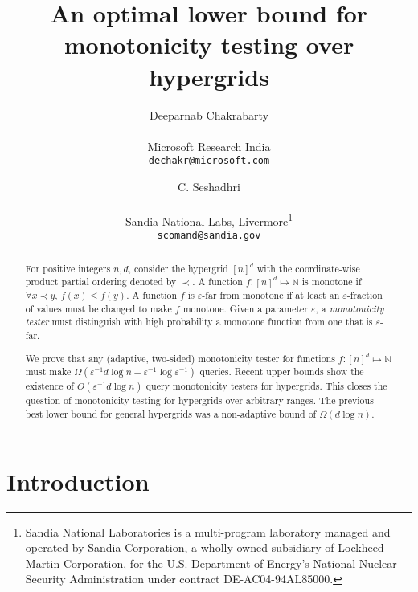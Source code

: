 \documentclass[11pt]{article}
\def\eps{\varepsilon}
\def\R{{\mathbb R}}
\newcommand{\NN}{\mathbb{N}}
\begin{document}
\author{Deeparnab Chakrabarty
  \\\\ 
  Microsoft Research India\\
  {\tt dechakr@microsoft.com} \\
\and C. Seshadhri \\\\ 
Sandia National Labs, Livermore\thanks{Sandia National Laboratories is a multi-program laboratory managed and operated by Sandia Corporation, a wholly owned subsidiary of Lockheed Martin Corporation, for the U.S. Department of Energy's National Nuclear Security Administration under contract DE-AC04-94AL85000.} \\
{\tt scomand@sandia.gov}}


\title{An optimal lower bound for monotonicity testing over hypergrids}



\date{}
\maketitle
\def\D{{\mathbf D}}
\def\R{{\mathbf R}}

\begin{abstract} For positive integers $n, d$, consider the hypergrid $[n]^d$ with the coordinate-wise product partial ordering denoted by $\prec$. 
A function $f: [n]^d \mapsto \NN$ is monotone if $\forall x \prec y$, $f(x) \leq f(y)$.
A function $f$ is $\eps$-far from monotone if at least an $\eps$-fraction of values must be changed to make
$f$ monotone. Given a parameter $\eps$, a \emph{monotonicity tester} must distinguish with high probability a monotone function from one that is $\eps$-far.

We prove that any (adaptive, two-sided) monotonicity tester for functions $f:[n]^d \mapsto \NN$ must make
$\Omega(\eps^{-1}d\log n - \eps^{-1}\log \eps^{-1})$ queries. Recent upper bounds show the existence of $O(\eps^{-1}d \log n)$
query monotonicity testers for hypergrids. This closes the question of monotonicity testing for hypergrids
over arbitrary ranges. The previous best lower bound for general hypergrids was a non-adaptive bound
of $\Omega(d \log n)$. 
\end{abstract}

\section{Introduction} \label{sec:intro}
\end{document}

